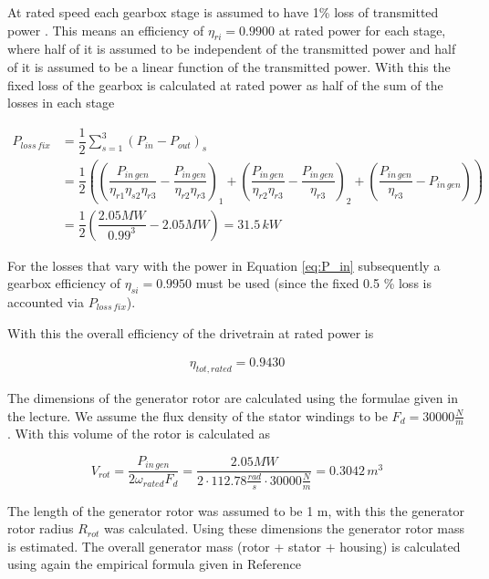 At rated speed each gearbox stage is assumed to have 1\% loss of transmitted power \cite{hau}. This means an efficiency of $\eta_{ri} = 0.9900$ at rated power for each stage, where half of it is assumed to be independent of the transmitted power and half of it is assumed to be a linear function of the transmitted power. With this the fixed loss of the gearbox is calculated at rated power as half of the sum of the losses in each stage

\begin{align}
    P_{loss\,fix} &= \dfrac{1}{2} \sum \limits_{s = 1}^{3} \left( P_{in} - P_{out}\right)_{s}\\
    &= \dfrac{1}{2} \left( \left( \dfrac{P_{in\,gen}}{\eta_{r1}\eta_{s2} \eta_{r3}} - \dfrac{P_{in\,gen}}{\eta_{r2} \eta_{r3}} \right)_{1} + \left( \dfrac{P_{in\,gen}}{\eta_{r2} \eta_{r3}} - \dfrac{P_{in\,gen}}{\eta_{r3}}\right)_{2}+ \left( \dfrac{P_{in\,gen}}{\eta_{r3}} - P_{in\,gen} \right) \right)\\
    &= \dfrac{1}{2} \left( \dfrac{2.05 MW}{0.99^3} - 2.05 MW \right) = 31.5 \,kW
\label{eq:Ploss_fix}
\end{align}

For the losses that vary with the power in Equation \ref{eq:P_in} subsequently a gearbox efficiency of $\eta_{si} = 0.9950$ must be used (since the fixed 0.5 \% loss is accounted via $P_{loss \, fix}$).

With this the overall efficiency of the drivetrain at rated power is

\begin{align}
\eta_{tot, rated} = 0.9430    
\end{align}

The dimensions of the generator rotor are calculated using the formulae given in the lecture. We assume the flux density of the stator windings to be $F_d = 30000 \frac{N}{m}$. With this volume of the rotor is calculated as

\begin{equation}
    V_{rot} = \dfrac{P_{in \, gen}}{2 \omega_{rated} F_d} = \dfrac{2.05 MW}{2 \cdot 112.78 \frac{rad}{s} \cdot 30000 \frac{N}{m}} = 0.3042 \,m^3
\end{equation}

The length of the generator rotor was assumed to be 1 m, with this the generator rotor radius $R_{rot}$ was calculated. Using these dimensions the generator rotor mass is estimated. The overall generator mass (rotor + stator + housing) is calculated using again the empirical formula given in Reference~\cite{Fingersh2006}

